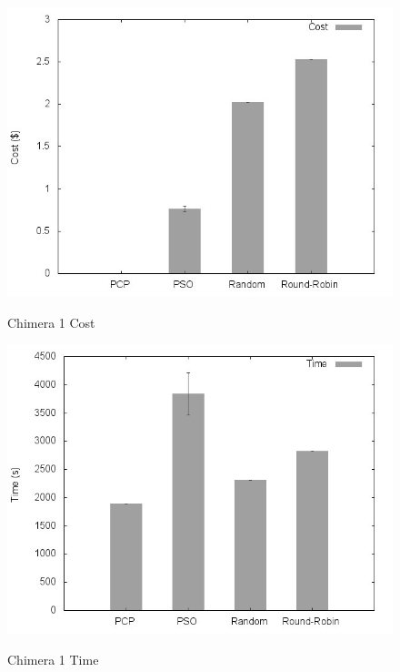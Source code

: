 \documentclass[a4paper,10pt]{article}
\begin{document}
\begin{figure}[!htb]

\centering

\includegraphics[scale=.55]{graphs/chimera1_cost.jpeg}
\label{chimera1_cost}
\caption{Chimera 1 Cost}

\includegraphics[scale=.55]{graphs/chimera1_time.jpeg}
\label{chimera1_time}
\caption{Chimera 1 Time}

\end{figure}
\end{document}
